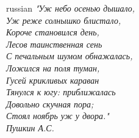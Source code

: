 {
\begin{flushright}
\begin{otherlanguage*}{russian}
\itshape
"Уж небо осенью дышало,\\
Уж реже солнышко блистало,\\
Короче становился день,\\
Лесов таинственная сень\\
С печальным шумом обнажалась,\\
Ложился на поля туман,\\
Гусей крикливых караван\\
Тянулся к югу: приближалась\\
Довольно скучная пора;\\
Стоял ноябрь уж у двора."\\
\textit{Пушкин А.С.}
\end{otherlanguage*}
\end{flushright}

}